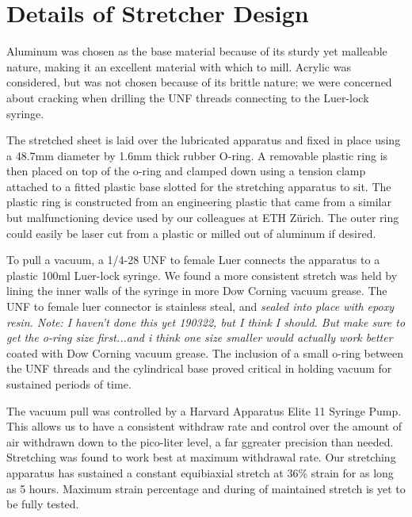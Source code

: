 \section{Details of Stretcher Design}
Aluminum was chosen as the base material because of its sturdy yet malleable nature, making it an excellent material with which to mill. Acrylic was considered, but was not chosen because of its brittle nature; we were concerned about cracking when drilling the UNF threads connecting to the Luer-lock syringe.

The stretched sheet is laid over the lubricated apparatus and fixed in place using a 48.7mm diameter by 1.6mm thick rubber O-ring. A removable plastic ring is then placed on top of the o-ring and clamped down using a tension clamp attached to a fitted plastic base slotted for the stretching apparatus to sit. The plastic ring is constructed from an engineering plastic that came from a similar but malfunctioning device used by our colleagues at ETH Zürich. The outer ring could easily be laser cut from a plastic or milled out of aluminum if desired. 

To pull a vacuum, a 1/4-28 UNF to female Luer connects the apparatus to a plastic 100ml Luer-lock syringe. We found a more consistent stretch was held by lining the inner walls of the syringe in more Dow Corning vacuum grease. The UNF to female luer connector is stainless steal, and \emph{sealed into place with epoxy resin. Note: I haven't done this yet 190322, but I think I should. But make sure to get the o-ring size first...and i think one size smaller would actually work better}
coated with Dow Corning vacuum grease. The inclusion of a small o-ring between the UNF threads and the cylindrical base proved critical in holding vacuum for sustained periods of time.

The vacuum pull was controlled by a Harvard Apparatus Elite 11 Syringe Pump. This allows us to have a consistent withdraw rate and control over the amount of air withdrawn down to the pico-liter level, a far ggreater precision than needed. Stretching was found to work best at maximum withdrawal rate. Our stretching apparatus has sustained a constant equibiaxial stretch at 36\% strain for as long as 5 hours. Maximum strain percentage and during of maintained stretch is yet to be fully tested.


